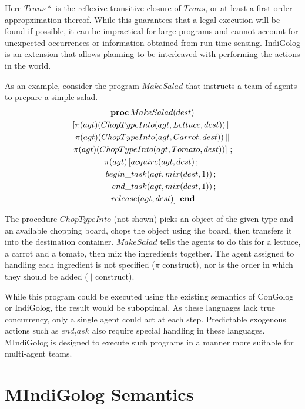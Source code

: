 \documentclass[letterpaper]{article}
\begin{document}
Here $Trans*$ is the reflexive transitive closure of $Trans$, or at least a
first-order appropximation thereof.
While this guarantees that a legal execution
will be found if possible, it can be impractical for large programs
and cannot account for unexpected occurrences or information obtained
from run-time sensing.  IndiGolog \cite{giacomo99indigolog} is an extension
that allows planning to be interleaved with performing the actions in the world.

As an example, consider the program $MakeSalad$ that instructs a team of
agents to prepare a simple salad.
\begin{multline}
\label{eqn:MakeSalad}
\mathbf{proc}\,MakeSalad(dest)\\
\left[\pi(agt)(ChopTypeInto(agt,Lettuce,dest))\,||\right.\\
\pi(agt)(ChopTypeInto(agt,Carrot,dest))\,||\\
\left.\pi(agt)(ChopTypeInto(agt,Tomato,dest))\right]\,;\\
\pi(agt)\left[acquire(agt,dest)\,;\right.\\
 \shoveright{begin\_task(agt,mix(dest,1))\,;\quad}\\
 \shoveright{end\_task(agt,mix(dest,1))\,;\quad}\\
 \left.release(agt,dest)\right]\,\,\mathbf{end}
\end{multline}

The procedure $ChopTypeInto$ (not shown) picks an object of the given
type and an available chopping board, chops the object using the board,
then transfers it into the destination container. $MakeSalad$ tells
the agents to do this for a lettuce, a carrot and a tomato, then mix
the ingredients together. The agent assigned to handling
each ingredient is not specified ($\pi$ construct), nor is the order in which
they should be added ($||$ construct). 

While this program could be executed using the existing semantics of ConGolog
or IndiGolog, the result would be suboptimal.  As these languages lack true
concurrency, only a single agent could act at each step.
Predictable exogenous actions such
as $end_task$ also require special handling in these languages.  MIndiGolog
is designed to execute such programs in a manner more suitable for multi-agent
teams.

\section{MIndiGolog Semantics}
\end{document}
